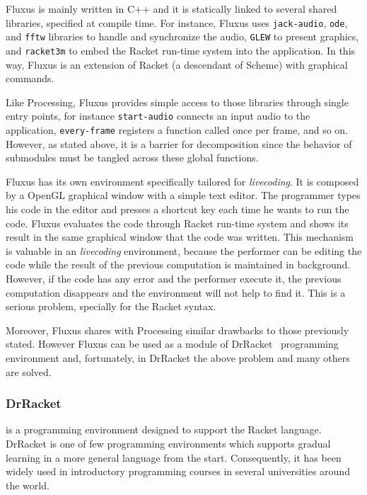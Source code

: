 Fluxus is mainly written in C++ and it is statically linked to several shared libraries, specified at compile time. For instance, Fluxus uses \texttt{jack-audio}, \texttt{ode}, and \texttt{fftw} libraries to handle and synchronize the audio, \texttt{GLEW} to present graphics, and \texttt{racket3m} to embed the Racket run-time system into the application. In this way, Fluxus is an extension of Racket (a descendant of Scheme) with graphical commands.

Like Processing, Fluxus provides simple access to those libraries through single entry points, for instance \texttt{start-audio} connects an input audio to the application, \texttt{every-frame} registers a function called once per frame, and so on. However, as stated above, it is a barrier for decomposition since the behavior of submodules must be tangled across these global functions.

Fluxus has its own environment specifically tailored for \textit{livecoding}. It is composed by a OpenGL graphical window with a simple text editor. The programmer types his code in the editor and presses a shortcut key each time he wants to run the code. Fluxus evaluates the code through Racket run-time system and shows its result in the same graphical window that the code was written. This mechanism is valuable in an \textit{livecoding} environment, because the performer can be editing the code while the result of the previous computation is maintained in background. However, if the code has any error and the performer execute it, the previous computation disappears and the environment will not help to find it. This is a serious problem, specially for the Racket syntax.

Moreover, Fluxus shares with Processing similar drawbacks to those previously stated. However Fluxus can be used as a module of DrRacket~\cite{findler2002drscheme} programming environment and, fortunately, in DrRacket the above problem and many others are solved.
\subsubsection{DrRacket~\cite{findler2002drscheme}} is a programming environment designed to support the Racket language. DrRacket is one of few programming environments which supports gradual learning in a more general language from the start. Consequently, it has been widely used in introductory programming courses in several universities around the world.


